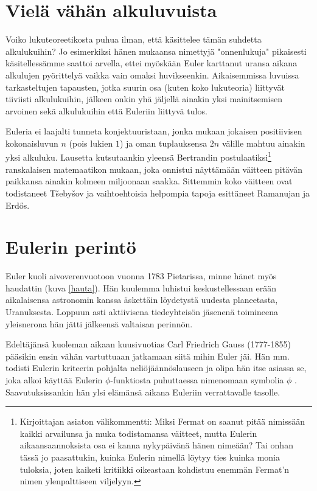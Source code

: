 \documentclass[a4paper,11pt]{article}
\begin{document}
\section{Vielä vähän alkuluvuista}

Voiko lukuteoreetikosta puhua ilman, että käsittelee tämän suhdetta alkulukuihin? Jo esimerkiksi hänen mukaansa nimettyjä "onnenlukuja" pikaisesti käsitellessämme saattoi arvella, ettei myöskään Euler karttanut uransa aikana alkulujen pyörittelyä vaikka vain omaksi huvikseenkin. Aikaisemmissa luvuissa tarkasteltujen tapausten, jotka suurin osa (kuten koko lukuteoria) liittyvät tiiviisti alkulukuihin, jälkeen onkin yhä jäljellä ainakin yksi mainitsemisen arvoinen sekä alkulukuihin että Euleriin liittyvä tulos.

Euleria ei laajalti tunneta konjektuuristaan, jonka mukaan jokaisen positiivisen kokonaisluvun $n$ (pois lukien $1$) ja oman tuplauksensa $2n$ välille mahtuu ainakin yksi alkuluku. Lausetta kutsutaankin yleensä Bertrandin postulaatiksi\footnote{Kirjoittajan asiaton välikommentti: Miksi Fermat on saanut pitää nimissään kaikki arvailunsa ja muka todistamansa väitteet, mutta Eulerin aikaansaannoksista osa ei kanna nykypäivänä hänen nimeään? Tai onhan tässä jo paasattukin, kuinka Eulerin nimellä löytyy ties kuinka monia tuloksia, joten kaiketi kritiikki oikeastaan kohdistuu enemmän Fermat'n nimen ylenpalttiseen viljelyyn.} ranskalaisen matemaatikon mukaan, joka onnistui näyttämään väitteen pitävän paikkansa ainakin kolmeen miljoonaan saakka. Sittemmin koko väitteen ovat todistaneet Tšebyšov ja vaihtoehtoisia helpompia tapoja esittäneet Ramanujan ja Erdős.

\section{Eulerin perintö}
\label{seiska}

Euler kuoli aivoverenvuotoon vuonna 1783 Pietarissa, minne hänet myös haudattin (kuva \ref{hauta}). Hän kuulemma luhistui keskustellessaan erään aikalaisensa astronomin kanssa äskettäin löydetystä uudesta planeetasta, Uranuksesta. Loppuun asti aktiivisena tiedeyhteisön jäsenenä toimineena yleisnerona hän jätti jälkeensä valtaisan perinnön.

Edeltäjänsä kuoleman aikaan kuusivuotias Carl Friedrich Gauss (1777-1855) pääsikin ensin vähän vartuttuaan jatkamaan siitä mihin Euler jäi. Hän mm. todisti Eulerin kriteerin pohjalta neliöjäännöslauseen ja olipa hän itse asiassa se, joka alkoi käyttää Eulerin $\phi$-funktiosta puhuttaessa nimenomaan symbolia $\phi$ \cite{Karatsuba}. Saavutuksissankin hän ylsi elämänsä aikana Euleriin verrattavalle tasolle.
\end{document}
